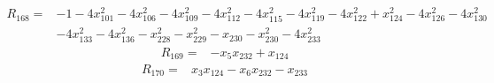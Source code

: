 \begin{align*}
 R_{168}={}&-1 -4x_{101}^{2} -4x_{106}^{2} -4x_{109}^{2} -4x_{112}^{2} -4x_{115}^{2} -4x_{119}^{2} -4x_{122}^{2} +x_{124}^{2} -4x_{126}^{2} -4x_{130}^{2}\\
 &-4x_{133}^{2} -4x_{136}^{2} -x_{228}^{2} -x_{229}^{2} -x_{230} -x_{230}^{2} -4x_{233}^{2}
\end{align*}
\begin{align*}
 R_{169}={}&-x_{5}x_{232} +x_{124}
\end{align*}
\begin{align*}
 R_{170}={}&x_{3}x_{124} -x_{6}x_{232} -x_{233}
\end{align*}
